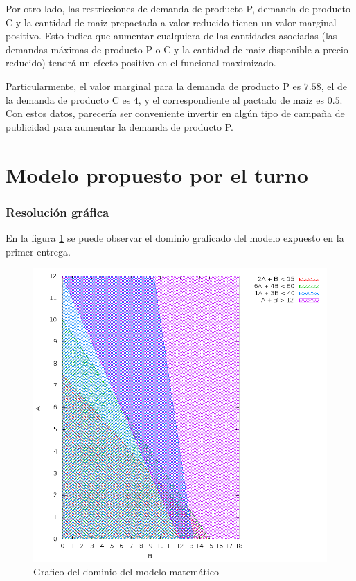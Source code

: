 \documentclass[a4paper,11pt]{article}
\begin{document}
Por otro lado, las restricciones de demanda de producto P, demanda de producto
C y la cantidad de maiz prepactada a valor reducido tienen un valor marginal
positivo. Esto indica que aumentar cualquiera de las cantidades asociadas (las
demandas máximas de producto P o C y la cantidad de maiz disponible a precio
reducido) tendrá un efecto positivo en el funcional maximizado.

Particularmente, el valor marginal para la demanda de producto P es \(7.58\),
el de la demanda de producto C es \(4\), y el correspondiente al pactado de
maiz es \(0.5\). Con estos datos, parecería ser conveniente invertir en algún
tipo de campaña de publicidad para aumentar la demanda de producto P.

\clearpage
\part{Modelo propuesto por el turno}

\section{Resolución gráfica} \label{sec:grafica}

En la figura \ref{fig:resolucion} se puede observar el dominio graficado del
modelo expuesto en la primer entrega.

\begin{figure}[h!]
  \centering
  \includegraphics[width=\textwidth]{graphic/output.png}
  \caption{Grafico del dominio del modelo matemático}\label{fig:resolucion}
\end{figure}
\end{document}
